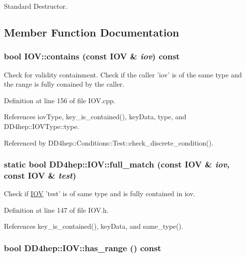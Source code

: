 Standard Destructor. 

\subsection{Member Function Documentation}
\hypertarget{class_d_d4hep_1_1_i_o_v_abe1a3f5122ab3e9aa97a82a1444a515d}{
\subsubsection[{contains}]{\setlength{\rightskip}{0pt plus 5cm}bool IOV::contains (const {\bf IOV} \& {\em iov}) const}}
\label{class_d_d4hep_1_1_i_o_v_abe1a3f5122ab3e9aa97a82a1444a515d}


Check for validity containment. Check if the caller 'iov' is of the same type and the range is fully conained by the caller. 

Definition at line 156 of file IOV.cpp.

References iovType, key\_\-is\_\-contained(), keyData, type, and DD4hep::IOVType::type.

Referenced by DD4hep::Conditions::Test::check\_\-discrete\_\-condition().\hypertarget{class_d_d4hep_1_1_i_o_v_aa1b5388443f86ca31d23c99a34f444c5}{
\subsubsection[{full\_\-match}]{\setlength{\rightskip}{0pt plus 5cm}static bool DD4hep::IOV::full\_\-match (const {\bf IOV} \& {\em iov}, \/  const {\bf IOV} \& {\em test})}}
\label{class_d_d4hep_1_1_i_o_v_aa1b5388443f86ca31d23c99a34f444c5}


Check if \hyperlink{class_d_d4hep_1_1_i_o_v}{IOV} 'test' is of same type and is fully contained in iov. 

Definition at line 147 of file IOV.h.

References key\_\-is\_\-contained(), keyData, and same\_\-type().\hypertarget{class_d_d4hep_1_1_i_o_v_a9c942c869bb92e7b14b6d6308a6f15d7}{
\subsubsection[{has\_\-range}]{\setlength{\rightskip}{0pt plus 5cm}bool DD4hep::IOV::has\_\-range () const}}
\label{class_d_d4hep_1_1_i_o_v_a9c942c869bb92e7b14b6d6308a6f15d7}


